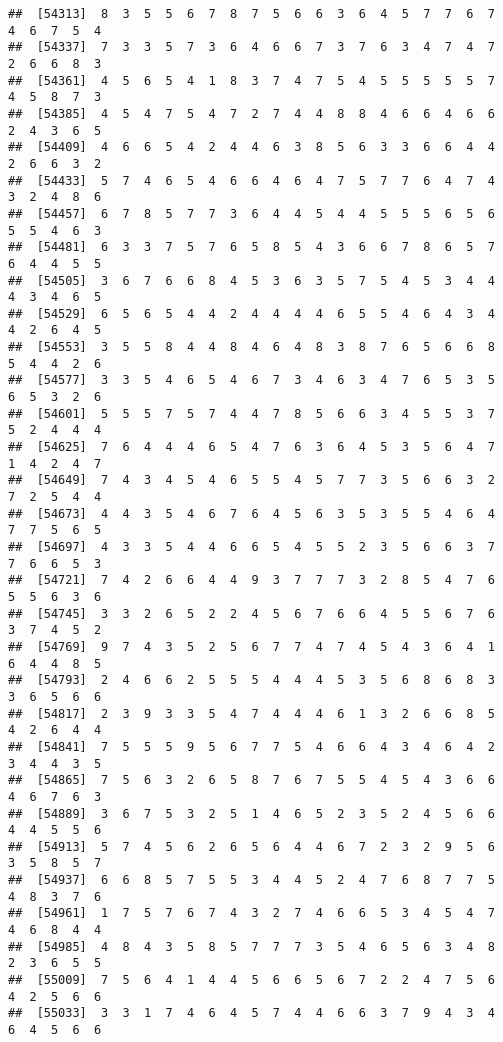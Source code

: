 \documentclass[
]{book}
\begin{document}
\begin{verbatim}
##  [54313]  8  3  5  5  6  7  8  7  5  6  6  3  6  4  5  7  7  6  7  4  6  7  5  4
##  [54337]  7  3  3  5  7  3  6  4  6  6  7  3  7  6  3  4  7  4  7  2  6  6  8  3
##  [54361]  4  5  6  5  4  1  8  3  7  4  7  5  4  5  5  5  5  5  7  4  5  8  7  3
##  [54385]  4  5  4  7  5  4  7  2  7  4  4  8  8  4  6  6  4  6  6  2  4  3  6  5
##  [54409]  4  6  6  5  4  2  4  4  6  3  8  5  6  3  3  6  6  4  4  2  6  6  3  2
##  [54433]  5  7  4  6  5  4  6  6  4  6  4  7  5  7  7  6  4  7  4  3  2  4  8  6
##  [54457]  6  7  8  5  7  7  3  6  4  4  5  4  4  5  5  5  6  5  6  5  5  4  6  3
##  [54481]  6  3  3  7  5  7  6  5  8  5  4  3  6  6  7  8  6  5  7  6  4  4  5  5
##  [54505]  3  6  7  6  6  8  4  5  3  6  3  5  7  5  4  5  3  4  4  4  3  4  6  5
##  [54529]  6  5  6  5  4  4  2  4  4  4  4  6  5  5  4  6  4  3  4  4  2  6  4  5
##  [54553]  3  5  5  8  4  4  8  4  6  4  8  3  8  7  6  5  6  6  8  5  4  4  2  6
##  [54577]  3  3  5  4  6  5  4  6  7  3  4  6  3  4  7  6  5  3  5  6  5  3  2  6
##  [54601]  5  5  5  7  5  7  4  4  7  8  5  6  6  3  4  5  5  3  7  5  2  4  4  4
##  [54625]  7  6  4  4  4  6  5  4  7  6  3  6  4  5  3  5  6  4  7  1  4  2  4  7
##  [54649]  7  4  3  4  5  4  6  5  5  4  5  7  7  3  5  6  6  3  2  7  2  5  4  4
##  [54673]  4  4  3  5  4  6  7  6  4  5  6  3  5  3  5  5  4  6  4  7  7  5  6  5
##  [54697]  4  3  3  5  4  4  6  6  5  4  5  5  2  3  5  6  6  3  7  7  6  6  5  3
##  [54721]  7  4  2  6  6  4  4  9  3  7  7  7  3  2  8  5  4  7  6  5  5  6  3  6
##  [54745]  3  3  2  6  5  2  2  4  5  6  7  6  6  4  5  5  6  7  6  3  7  4  5  2
##  [54769]  9  7  4  3  5  2  5  6  7  7  4  7  4  5  4  3  6  4  1  6  4  4  8  5
##  [54793]  2  4  6  6  2  5  5  5  4  4  4  5  3  5  6  8  6  8  3  3  6  5  6  6
##  [54817]  2  3  9  3  3  5  4  7  4  4  4  6  1  3  2  6  6  8  5  4  2  6  4  4
##  [54841]  7  5  5  5  9  5  6  7  7  5  4  6  6  4  3  4  6  4  2  3  4  4  3  5
##  [54865]  7  5  6  3  2  6  5  8  7  6  7  5  5  4  5  4  3  6  6  4  6  7  6  3
##  [54889]  3  6  7  5  3  2  5  1  4  6  5  2  3  5  2  4  5  6  6  4  4  5  5  6
##  [54913]  5  7  4  5  6  2  6  5  6  4  4  6  7  2  3  2  9  5  6  3  5  8  5  7
##  [54937]  6  6  8  5  7  5  5  3  4  4  5  2  4  7  6  8  7  7  5  4  8  3  7  6
##  [54961]  1  7  5  7  6  7  4  3  2  7  4  6  6  5  3  4  5  4  7  4  6  8  4  4
##  [54985]  4  8  4  3  5  8  5  7  7  7  3  5  4  6  5  6  3  4  8  2  3  6  5  5
##  [55009]  7  5  6  4  1  4  4  5  6  6  5  6  7  2  2  4  7  5  6  4  2  5  6  6
##  [55033]  3  3  1  7  4  6  4  5  7  4  4  6  6  3  7  9  4  3  4  6  4  5  6  6

\end{verbatim}
\end{document}
